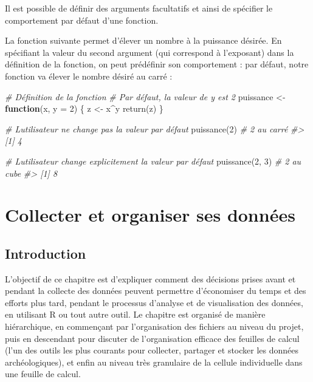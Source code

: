 \documentclass[
  french,
]{scrbook}
\newenvironment{Shaded}{\begin{snugshade}}{\end{snugshade}}
\newcommand{\AttributeTok}[1]{\textcolor[rgb]{0.77,0.63,0.00}{#1}}
\newcommand{\CommentTok}[1]{\textcolor[rgb]{0.56,0.35,0.01}{\textit{#1}}}
\newcommand{\ControlFlowTok}[1]{\textcolor[rgb]{0.13,0.29,0.53}{\textbf{#1}}}
\newcommand{\DecValTok}[1]{\textcolor[rgb]{0.00,0.00,0.81}{#1}}
\newcommand{\FunctionTok}[1]{\textcolor[rgb]{0.00,0.00,0.00}{#1}}
\newcommand{\NormalTok}[1]{#1}
\newcommand{\OtherTok}[1]{\textcolor[rgb]{0.56,0.35,0.01}{#1}}
\newcommand{\SpecialCharTok}[1]{\textcolor[rgb]{0.00,0.00,0.00}{#1}}
\begin{document}
Il est possible de définir des arguments facultatifs et ainsi de spécifier le comportement par défaut d'une fonction.

La fonction suivante permet d'élever un nombre à la puissance désirée. En spécifiant la valeur du second argument (qui correspond à l'exposant) dans la définition de la fonction, on peut prédéfinir son comportement : par défaut, notre fonction va élever le nombre désiré au carré :

\begin{Shaded}
\begin{Highlighting}[]
\CommentTok{\# Définition de la fonction}
\CommentTok{\# Par défaut, la valeur de y est 2}
\NormalTok{puissance }\OtherTok{\textless{}{-}} \ControlFlowTok{function}\NormalTok{(x, }\AttributeTok{y =} \DecValTok{2}\NormalTok{) \{}
\NormalTok{  z }\OtherTok{\textless{}{-}}\NormalTok{ x}\SpecialCharTok{\^{}}\NormalTok{y}
  \FunctionTok{return}\NormalTok{(z)}
\NormalTok{\}}

\CommentTok{\# L\textquotesingle{}utilisateur ne change pas la valeur par défaut}
\FunctionTok{puissance}\NormalTok{(}\DecValTok{2}\NormalTok{) }\CommentTok{\# 2 au carré}
\CommentTok{\#\textgreater{} [1] 4}

\CommentTok{\# L\textquotesingle{}utilisateur change explicitement la valeur par défaut}
\FunctionTok{puissance}\NormalTok{(}\DecValTok{2}\NormalTok{, }\DecValTok{3}\NormalTok{) }\CommentTok{\# 2 au cube}
\CommentTok{\#\textgreater{} [1] 8}
\end{Highlighting}
\end{Shaded}

\hypertarget{part-collecter-et-organiser-ses-donnuxe9es}{%
\part{Collecter et organiser ses données}\label{part-collecter-et-organiser-ses-donnuxe9es}}

\hypertarget{collect-introduction}{%
\chapter{Introduction}\label{collect-introduction}}

L'objectif de ce chapitre est d'expliquer comment des décisions prises avant et pendant la collecte des données peuvent permettre d'économiser du temps et des efforts plus tard, pendant le processus d'analyse et de visualisation des données, en utilisant R ou tout autre outil. Le chapitre est organisé de manière hiérarchique, en commençant par l'organisation des fichiers au niveau du projet, puis en descendant pour discuter de l'organisation efficace des feuilles de calcul (l'un des outils les plus courants pour collecter, partager et stocker les données archéologiques), et enfin au niveau très granulaire de la cellule individuelle dans une feuille de calcul.
\end{document}

